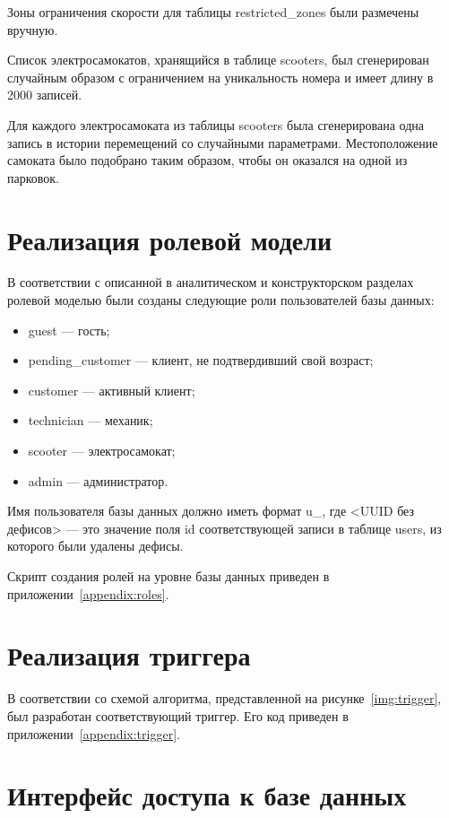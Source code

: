 Зоны ограничения скорости для таблицы restricted\_zones были размечены вручную.

Список электросамокатов, хранящийся в таблице scooters, был сгенерирован случайным образом с ограничением на уникальность номера и имеет длину в 2000 записей.

Для каждого электросамоката из таблицы scooters была сгенерирована одна запись в истории перемещений со случайными параметрами. Местоположение самоката было подобрано таким образом, чтобы он оказался на одной из парковок.

\section{Реализация ролевой модели}

В соответствии с описанной в аналитическом и конструкторском разделах ролевой моделью были созданы следующие роли пользователей базы данных:

\begin{itemize}
    \item guest --- гость;
    \item pending\_customer --- клиент, не подтвердивший свой возраст;
    \item customer --- активный клиент;
    \item technician --- механик;
    \item scooter --- электросамокат;
    \item admin --- администратор.
\end{itemize}

Имя пользователя базы данных должно иметь формат u\_<UUID без дефисов>, где <UUID без дефисов> --- это значение поля id соответствующей записи в таблице users, из которого были удалены дефисы.

Скрипт создания ролей на уровне базы данных приведен в приложении~\ref{appendix:roles}.

\section{Реализация триггера}

В соответствии со схемой алгоритма, представленной на рисунке~\ref{img:trigger}, был разработан соответствующий триггер. Его код приведен в приложении~\ref{appendix:trigger}.

\section{Интерфейс доступа к базе данных}

